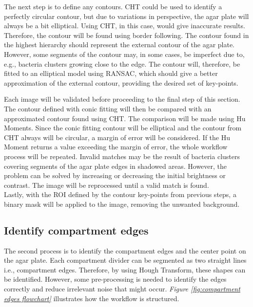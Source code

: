 \noindent The next step is to define any contours. CHT could be used to identify a perfectly circular contour, but due to variations in perspective, the agar plate will always be a bit elliptical. Using CHT, in this case, would give inaccurate results. Therefore, the contour will be found using border following. The contour found in the highest hierarchy should represent the external contour of the agar plate. However, some segments of the contour may, in some cases,  be imperfect due to, e.g., bacteria clusters growing close to the edge. The contour will, therefore, be fitted to an elliptical model using RANSAC, which should give a better approximation of the external contour, providing the desired set of key-points.  


\noindent Each image will be validated before proceeding to the final step of this section. The contour defined with conic fitting will then be compared with an approximated contour found using CHT. The comparison will be made using Hu Moments. Since the conic fitting contour will be elliptical and the contour from CHT always will be circular, a margin of error will be considered. If the Hu Moment returns a value exceeding the margin of error, the whole workflow process will be repeated. Invalid matches may be the result of bacteria clusters covering segments of the agar plate edges in shadowed areas. However, the problem can be solved by increasing or decreasing the initial brightness or contrast. The image will be reprocessed until a valid match is found. \\  

\noindent Lastly, with the ROI defined by the contour key-points from previous steps, a binary mask will be applied to the image, removing the unwanted background.\\


\subsection{Identify compartment edges}
\noindent The second process is to identify the compartment edges and the center point on the agar plate. Each compartment divider can be segmented as two straight lines i.e., compartment edges. Therefore, by using Hough Transform, these shapes can be identified. However, some pre-processing is needed to identify the edges correctly and reduce irrelevant noise that might occur. \textit{Figure \ref{fig:compartment edges flowchart} } illustrates how the workflow is structured. \\


